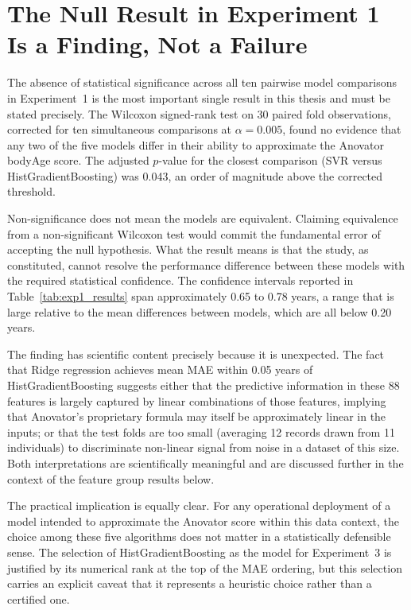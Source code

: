 \documentclass[11pt,a4paper]{report}
\begin{document}
\section{The Null Result in Experiment 1 Is a Finding, Not a Failure}

The absence of statistical significance across all ten pairwise model comparisons in Experiment~1
is the most important single result in this thesis and must be stated precisely. The Wilcoxon
signed-rank test on 30 paired fold observations, corrected for ten simultaneous comparisons at
$\alpha = 0.005$, found no evidence that any two of the five models differ in their ability to
approximate the Anovator bodyAge score. The adjusted $p$-value for the closest comparison (SVR versus HistGradientBoosting) was 0.043, an order of magnitude above the corrected threshold.

Non-significance does not mean the models are equivalent. Claiming equivalence from a non-significant
Wilcoxon test would commit the fundamental error of accepting the null hypothesis. What the result
means is that the study, as constituted, cannot resolve the performance difference between these
models with the required statistical confidence. The confidence intervals reported in
Table~\ref{tab:exp1_results} span approximately 0.65 to 0.78 years, a range that is large
relative to the mean differences between models, which are all below 0.20 years.

The finding has scientific content precisely because it is unexpected. The fact that Ridge
regression achieves mean MAE within 0.05 years of HistGradientBoosting suggests either that the
predictive information in these 88 features is largely captured by linear combinations of those
features, implying that Anovator's proprietary formula may itself be approximately linear in the
inputs; or that the test folds are too small (averaging 12 records drawn from 11 individuals)
to discriminate non-linear signal from noise in a dataset of this size. Both interpretations
are scientifically meaningful and are discussed further in the context of the feature group
results below.

The practical implication is equally clear. For any operational deployment of a model intended to
approximate the Anovator score within this data context, the choice among these five algorithms
does not matter in a statistically defensible sense. The selection of HistGradientBoosting as the
model for Experiment~3 is justified by its numerical rank at the top of the MAE ordering, but
this selection carries an explicit caveat that it represents a heuristic choice rather than a
certified one.
\end{document}
